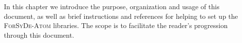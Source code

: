 In this chapter we introduce the purpose, organization and usage of this document, as well as brief instructions and references for helping to set up the \textsc{ForSyDe-Atom} libraries. The scope is to facilitate the reader's progression through this document.

